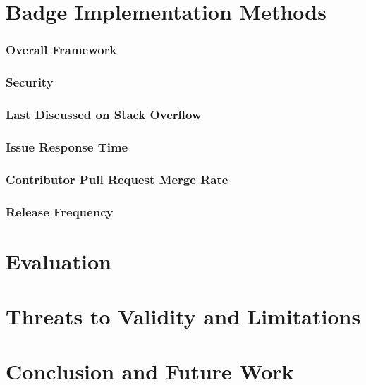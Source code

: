 \documentclass[12pt]{article}
\begin{document}
\section{Badge Implementation Methods}
\subsubsection{Overall Framework}
\subsubsection{Security}
\subsubsection{Last Discussed on Stack Overflow}
\subsubsection{Issue Response Time}
\subsubsection{Contributor Pull Request Merge Rate}
\subsubsection{Release Frequency}

\section{Evaluation}
\section{Threats to Validity and Limitations}
\section{Conclusion and Future Work}



\newpage


\end{document}
